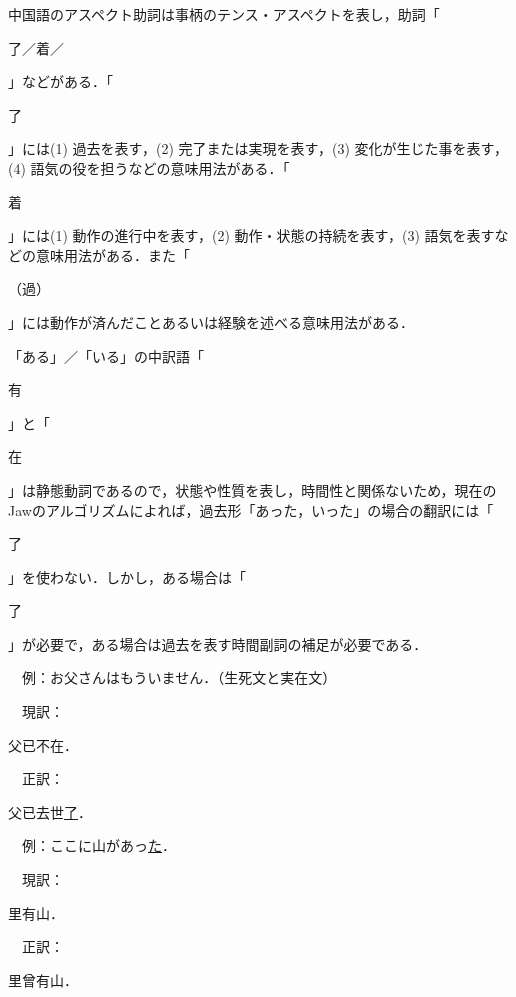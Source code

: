 \documentclass[japanese]{jnlp_1.4}
\begin{document}
中国語のアスペクト助詞は事柄のテンス・アスペクトを表し，助詞「\begin{簡体中文}了／着／\end{簡体中文}」などがある．「\begin{簡体中文}了\end{簡体中文}」には(1) 過去を表す，(2) 完了または実現を表す，(3) 変化が生じた事を表す，(4) 語気の役を担うなどの意味用法がある．「\begin{簡体中文}着\end{簡体中文}」には(1) 動作の進行中を表す，(2) 動作・状態の持続を表す，(3) 語気を表すなどの意味用法がある．また「\begin{簡体中文}（過）\end{簡体中文}」には動作が済んだことあるいは経験を述べる意味用法がある．

「ある」／「いる」の中訳語「\begin{簡体中文}有\end{簡体中文}」と「\begin{簡体中文}在\end{簡体中文}」は静態動詞であるので，状態や性質を表し，時間性と関係ないため，現在のJawのアルゴリズムによれば，過去形「あった，いった」の場合の翻訳には「\begin{簡体中文}了\end{簡体中文}」を使わない．しかし，ある場合は「\begin{簡体中文}了\end{簡体中文}」が必要で，ある場合は過去を表す時間副詞の補足が必要である．

　例：お父さんはもういません．（生死文と実在文）

　現訳：\begin{簡体中文}父已不在．\end{簡体中文}

　正訳：\begin{簡体中文}父已去世\ul{了}．\end{簡体中文}

　例：ここに山があっ\ul{た}．

　現訳：\begin{簡体中文}里有山．\end{簡体中文}

　正訳：\begin{簡体中文}里曾有山．\end{簡体中文}
\end{document}
